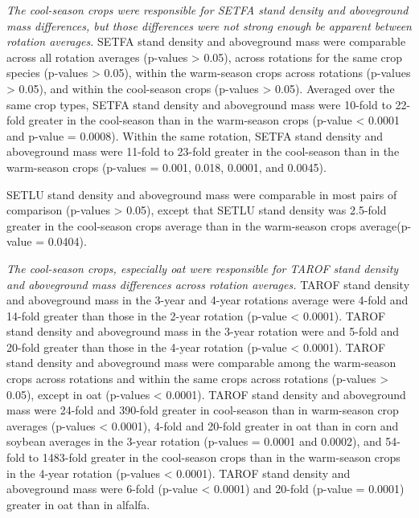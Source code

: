 \documentclass[
]{article}
\begin{document}
\emph{The cool-season crops were responsible for SETFA stand density and aboveground mass differences, but those differences were not strong enough be apparent between rotation averages.} SETFA stand density and aboveground mass were comparable across all rotation averages (p-values \textgreater{} 0.05), across rotations for the same crop species (p-values \textgreater{} 0.05), within the warm-season crops across rotations (p-values \textgreater{} 0.05), and within the cool-season crops (p-values \textgreater{} 0.05). Averaged over the same crop types, SETFA stand density and aboveground mass were 10-fold to 22-fold greater in the cool-season than in the warm-season crops (p-value \textless{} 0.0001 and p-value = 0.0008). Within the same rotation, SETFA stand density and aboveground mass were 11-fold to 23-fold greater in the cool-season than in the warm-season crops (p-values = 0.001, 0.018, 0.0001, and 0.0045).

SETLU stand density and aboveground mass were comparable in most pairs of comparison (p-values \textgreater{} 0.05), except that SETLU stand density was 2.5-fold greater in the cool-season crops average than in the warm-season crops average(p-value = 0.0404).

\emph{The cool-season crops, especially oat were responsible for TAROF stand density and aboveground mass differences across rotation averages.} TAROF stand density and aboveground mass in the 3-year and 4-year rotations average were 4-fold and 14-fold greater than those in the 2-year rotation (p-value \textless{} 0.0001). TAROF stand density and aboveground mass in the 3-year rotation were and 5-fold and 20-fold greater than those in the 4-year rotation (p-value \textless{} 0.0001). TAROF stand density and aboveground mass were comparable among the warm-season crops across rotations and within the same crops across rotations (p-values \textgreater{} 0.05), except in oat (p-values \textless{} 0.0001). TAROF stand density and aboveground mass were 24-fold and 390-fold greater in cool-season than in warm-season crop averages (p-values \textless{} 0.0001), 4-fold and 20-fold greater in oat than in corn and soybean averages in the 3-year rotation (p-values = 0.0001 and 0.0002), and 54-fold to 1483-fold greater in the cool-season crops than in the warm-season crops in the 4-year rotation (p-values \textless{} 0.0001). TAROF stand density and aboveground mass were 6-fold (p-value \textless{} 0.0001) and 20-fold (p-value = 0.0001) greater in oat than in alfalfa.
\end{document}

